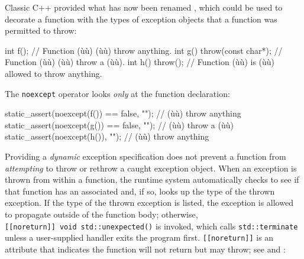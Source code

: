 Classic C++ provided what has now been renamed , which could be used to decorate a function with the
types of exception objects that a function was permitted to throw:

\begin{emcppslisting}[emcppsbatch=e2]
int f();                     // Function (ù{}ù) (ù{}ù) throw anything.
int g() throw(const char*);  // Function (ù{}ù) (ù{}ù) throw a (ù{}ù).
int h() throw();             // Function (ù{}ù) is (ù{}ù) allowed to throw anything.
\end{emcppslisting}
    

\noindent The \lstinline!noexcept! operator looks \emph{only} at the function
declaration:

\begin{emcppslisting}[emcppsbatch=e2]
static_assert(noexcept(f()) == false, "");  // (ù{}ù) throw anything
static_assert(noexcept(g()) == false, "");  // (ù{}ù) throw a (ù{}ù)
static_assert(noexcept(h()),  "");  // (ù{}ù) throw anything
\end{emcppslisting}
    

\noindent Providing a \emph{dynamic} exception specification does not prevent a
function from \emph{attempting} to throw or rethrow a caught exception
object. When an exception is thrown from within a function, the runtime
system automatically checks to see if that function has an associated
 and, if so, looks up the type
of the thrown exception. If the type of the thrown exception is listed,
the exception is allowed to propagate outside of the function body;
otherwise,
\lstinline![[noreturn]]!~\lstinline!void!~\lstinline!std::unexpected()! is
invoked, which calls \lstinline!std::terminate! unless a user-supplied
handler exits the program first. \lstinline![[noreturn]]! is an attribute
that indicates the function will not return but may throw; see
 and :

